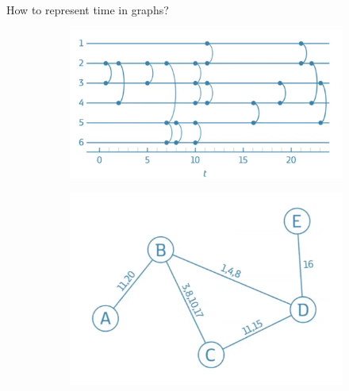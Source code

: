 \documentclass{beamer}
\begin{document}
\begin{frame}{How to represent time in graphs?}
		\centering
		\begin{figure}
				\begin{subfigure}{0.42\textwidth}
						\centering
						\includegraphics[width=\textwidth]{media/temporal_sense_1.png}
				\end{subfigure}
				\hfill
				\begin{subfigure}{0.42\textwidth}
						\centering
						\includegraphics[width=\textwidth]{media/temporal_sense_2.png}
				\end{subfigure}

				\vspace{0.5cm} %


\end{figure}
\end{frame}
\end{document}
